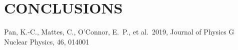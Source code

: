 \documentclass[preprint]{aastex63}
\begin{document}
\section{CONCLUSIONS}

\begin{thebibliography}{9}

 Pan, K.-C., Mattes, C., O'Connor, E.~P., et al.\ 2019, Journal of Physics G Nuclear Physics, 46, 014001
  
\end{thebibliography}  
\end{document}
